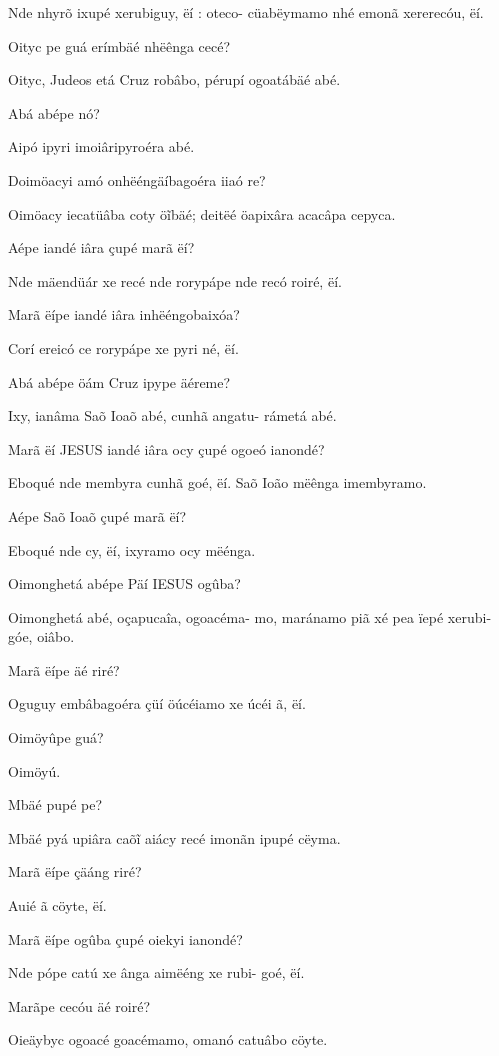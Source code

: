 \documentclass[openany,titlepage,12pt]{book}
\begin{document}
\begin{altereven}
    \item Nde nhyrõ ixupé xerubiguy, ëí : oteco-
        cüabëymamo nhé emonã xererecóu, ëí.
    \item Oityc pe guá erímbäé nhëênga cecé?
    \item Oityc, Judeos etá Cruz robâbo, pérupí
        ogoatábäé abé.
    \item Abá abépe nó?
    \item Aipó ipyri imoiâripyroéra abé.
    \item Doimöacyi amó onhëéngäíbagoéra iiaó
        re?
    \item Oimöacy iecatüâba coty ö\~ibäé; deitëé\linebreak
        öapixâra acacâpa cepyca.
    \item Aépe iandé iâra çupé marã ëí?
    \item Nde mäendüár xe recé nde rorypápe nde
        recó roiré, ëí.
    \item Marã ëípe iandé iâra inhëéngobaixóa?
    \item Corí ereicó ce rorypápe xe pyri né, ëí.
    \item Abá abépe öám Cruz ipype äéreme?
    \item Ixy, ianâma Saõ Ioaõ abé, cunhã angatu-
        rámetá abé.
    \item Marã ëí JESUS iandé iâra ocy çupé
        ogoeó ianondé?
    \item Eboqué nde membyra cunhã goé, ëí. Saõ
        Ioão mëênga imembyramo.
    \item Aépe Saõ Ioaõ çupé marã ëí?
    \item Eboqué nde cy, ëí, ixyramo ocy mëénga.
    \item Oimonghetá abépe Päí IESUS ogûba?
    \item Oimonghetá abé, oçapucaîa, ogoacéma-
        mo, maránamo piã xé pea ïepé xerubi-\linebreak
        góe, oiâbo.
    \item Marã ëípe äé riré?
    \item Oguguy embâbagoéra çüí öúcéiamo xe
        úcéi ã, ëí.
    \item Oimöyûpe guá?
    \item Oimöyú.
    \pagebreak
    \item Mbäé pupé pe?
    \item Mbäé pyá upiâra caõ\~i aiácy recé imonãn
        ipupé cëyma.
    \item Marã ëípe çäáng riré?
    \item Auié ã cöyte, ëí.
    \item Marã ëípe ogûba çupé oiekyi ianondé?
    \item Nde pópe catú xe ânga aimëéng xe rubi-
        goé, ëí.
    \item Marãpe cecóu äé roiré?
    \item Oieäybyc ogoacé goacémamo, omanó\linebreak
        catuâbo cöyte.
\end{altereven}
\end{document}
